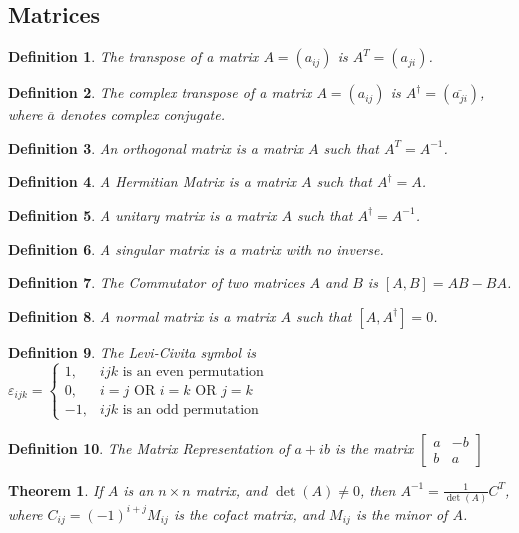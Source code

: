 \documentclass[oneside]{book}
\theoremstyle{mystyle}
\newtheorem{theorem}{Theorem}[section]
\newtheorem{definition}{Definition}[section]
\begin{document}
\subsection{Matrices}
\begin{definition}
The transpose of a matrix $A = (a_{ij})$ is $A^{T} = (a_{ji})$.
\end{definition}
\begin{definition}
The complex transpose of a matrix $A = (a_{ij})$ is $A^{\dagger} = (\overline{a_{ji}})$, where $\overline{a}$ denotes complex conjugate.
\end{definition}
\begin{definition}
An orthogonal matrix is a matrix $A$ such that $A^T = A^{-1}$.
\end{definition}
\begin{definition}
A Hermitian Matrix is a matrix $A$ such that $A^{\dagger} = A$.
\end{definition}
\begin{definition}
A unitary matrix is a matrix $A$ such that $A^{\dagger} = A^{-1}$.
\end{definition}
\begin{definition}
A singular matrix is a matrix with no inverse.
\end{definition}
\begin{definition}
The Commutator of two matrices $A$ and $B$ is $[A,B] = AB - BA$.
\end{definition}
\begin{definition}
A normal matrix is a matrix $A$ such that $[A,A^{\dagger}] = 0$.
\end{definition}
\begin{definition}
The Levi-Civita symbol is $\varepsilon_{ijk} = \begin{cases} 1, & ijk\textrm{ is an even permutation} \\ 0, & i=j\textrm{ OR }i=k\textrm{ OR }j=k\\ -1, & ijk\textrm{ is an odd permutation}\end{cases}$
\end{definition}
\begin{definition}
The Matrix Representation of $a+ib$ is the matrix $\begin{bmatrix}a & -b \\ b & a \end{bmatrix}$
\end{definition}
\begin{theorem}
If $A$ is an $n\times n$ matrix, and $\det(A) \ne 0$, then $A^{-1}= \frac{1}{\det(A)}C^{T}$, where $C_{ij} = (-1)^{i+j}M_{ij}$ is the cofact matrix, and $M_{ij}$ is the minor of $A$.
\end{theorem}
\end{document}
